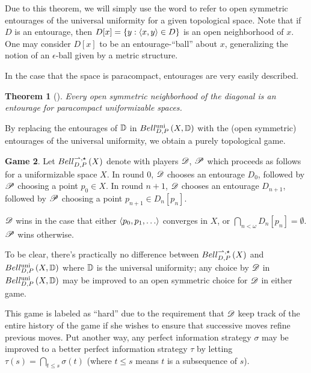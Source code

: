 \documentclass{amsart}
\newtheorem{theorem}{Theorem}[section]
\theoremstyle{definition}
\newtheorem{game}[theorem]{Game}
\begin{document}
  Due to this theorem, we will simply use the word  to refer
  to open symmetric entourages of the universal uniformity for
  a given topological space. Note that if \(D\) is an
  entourage, then \(D[x]=\{y:\langle x,y\rangle\in D\}\) is an open neighborhood of \(x\).
  One may consider
  \(D[x]\) to be an entourage-``ball'' about \(x\), generalizing the notion of
  an \(\epsilon\)-ball given by a metric structure.

  In the case that
  the space is paracompact, entourages are very easily described.

  \begin{theorem}[\cite{MR2048350}]
    Every open symmetric neighborhood of the diagonal is an entourage for
    paracompact uniformizable spaces.
  \end{theorem}

  By replacing the entourages of \(\mathbb{D}\) in \(Bell_{D,P}^{\textrm{uni}}\left({X,\mathbb{D}}\right)\)
  with the
  (open symmetric) entourages of the universal uniformity, we obtain
  a purely topological game.

  \begin{game}
    Let \(Bell_{D,P}^{\rightharpoonup,\star}\left({X}\right)\) denote  with
    players \(\mathscr{D}\), \(\mathscr{P}\) which proceeds as follows for
    a uniformizable space \(X\). In round \(0\),
    \(\mathscr{D}\) chooses an entourage \(D_0\), followed by \(\mathscr{P}\)
    choosing a point \(p_0\in X\). In round \(n+1\),
    \(\mathscr{D}\) chooses an entourage
    \(D_{n+1}\), followed by \(\mathscr{P}\) choosing a point \(p_{n+1}\in D_n[p_n]\).

    \(\mathscr{D}\) wins in the case that either
    \(\<p_0,p_1,\dots\>\) converges in \(X\),
    or \(\bigcap_{n<\omega}D_n[p_n] = \emptyset\). \(\mathscr{P}\) wins otherwise.
  \end{game}

  To be clear,
  there's practically no difference between \(Bell_{D,P}^{\rightharpoonup,\star}\left({X}\right)\) and
  \(Bell_{D,P}^{\textrm{uni}}\left({X,\mathbb{D}}\right)\) where \(\mathbb{D}\) is the universal uniformity;
  any choice by \(\mathscr{D}\) in \(Bell_{D,P}^{\textrm{uni}}\left({X,\mathbb{D}}\right)\) may be improved to
  an open symmetric choice for \(\mathscr{D}\) in either game.

  This game is labeled as ``hard'' due to the requirement that \(\mathscr{D}\)
  keep track of the entire history of the game if she wishes to
  ensure that successive moves refine previous moves.
  Put another way, any perfect information strategy \(\sigma\)
  may be improved to a better perfect information strategy \(\tau\) by letting
  \(\tau(s)=\bigcap_{t\leq s}\sigma(t)\) (where \(t\leq s\) means \(t\) is a
  subsequence of \(s\)).
\end{document}
